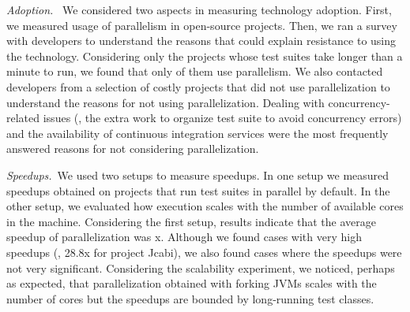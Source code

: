 \noindent\emph{Adoption.}~ We considered two aspects in
measuring technology adoption.  First, we measured usage of
parallelism in open-source projects.  Then, we ran a survey with
developers to understand the reasons that could explain resistance to
using the technology.  Considering only the projects whose test suites
take longer than a minute to run, we found that
only \percentParallelUpdated{} of them use parallelism.
We also contacted 
developers from a selection of costly projects that did not use
parallelization to understand the reasons for not using parallelization.  Dealing with concurrency-related issues (\eg{}, the
extra work to organize test suite to avoid concurrency errors) and the
availability of continuous integration services were the most
frequently answered reasons for not considering parallelization.


\noindent\emph{Speedups.}~We used two setups to measure
speedups.  In one setup we measured speedups obtained on
projects that run test suites in parallel by
default.  In the other setup, we evaluated how execution scales with
the number of available cores in the machine.  Considering the first setup, results
indicate that the average speedup of parallelization was
\avgSpeedup{}x.  Although we found cases with very high speedups
(\eg{}, 28.8x for project Jcabi), we also found cases where the speedups were
not very significant.  Considering the scalability experiment, we
noticed, perhaps as expected, that parallelization obtained with forking JVMs scales with the number
of cores but the speedups are bounded by
long-running test classes.

